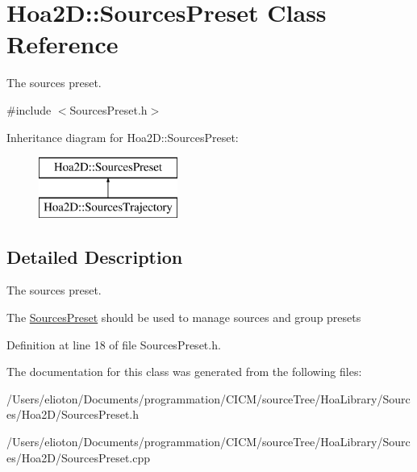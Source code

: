 \hypertarget{class_hoa2_d_1_1_sources_preset}{\section{Hoa2\-D\-:\-:Sources\-Preset Class Reference}
\label{class_hoa2_d_1_1_sources_preset}
}


The sources preset.  




{\ttfamily \#include $<$Sources\-Preset.\-h$>$}

Inheritance diagram for Hoa2\-D\-:\-:Sources\-Preset\-:\begin{figure}[H]
\begin{center}
\leavevmode
\includegraphics[height=2.000000cm]{class_hoa2_d_1_1_sources_preset}
\end{center}
\end{figure}


\subsection{Detailed Description}
The sources preset. 

The \hyperlink{class_hoa2_d_1_1_sources_preset}{Sources\-Preset} should be used to manage sources and group presets 

Definition at line 18 of file Sources\-Preset.\-h.



The documentation for this class was generated from the following files\-:\begin{DoxyCompactItemize}
\item 
/\-Users/elioton/\-Documents/programmation/\-C\-I\-C\-M/source\-Tree/\-Hoa\-Library/\-Sources/\-Hoa2\-D/Sources\-Preset.\-h\item 
/\-Users/elioton/\-Documents/programmation/\-C\-I\-C\-M/source\-Tree/\-Hoa\-Library/\-Sources/\-Hoa2\-D/Sources\-Preset.\-cpp\end{DoxyCompactItemize}

